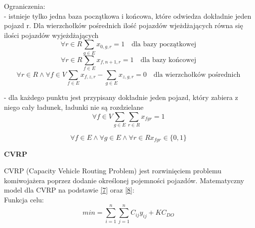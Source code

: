 \documentclass[a4paper, twoside, 12pt, justified]{article}
\begin{document}
	\hspace{-6mm}Ograniczenia:\\
	- istnieje tylko jedna baza początkowa i końcowa, które odwiedza dokładnie jeden pojazd r. Dla wierzchołków pośrednich ilość pojazdów wjeżdżających równa się ilości pojazdów wyjeżdżających\\
	
	\begin{equation}
	{\forall r \in R\sum\limits_{g \in E}}x_{0,g,r}=1 \quad \text{dla bazy początkowej}
	\end{equation}
	\begin{equation}
	{\forall r \in R\sum\limits_{f \in E}}x_{f,n+1,r}=1 \quad \text{dla bazy końcowej}
	\end{equation}
	\begin{equation}
	{\forall r \in R \wedge \forall f \in V\sum\limits_{f \in E}x_{f,z,r} -  \sum\limits_{g \in E}}x_{z,g,r} = 0\quad \text{dla wierzchołków pośrednich}
	\end{equation}
	
	\hspace{-6mm}- dla każdego punktu jest przypisany dokładnie jeden pojazd, który zabiera z niego cały ładunek, ładunki nie są rozdzielane\\
	
	\begin{equation}
	{\forall f \in V \sum\limits_{g \in E} \sum\limits_{r \in R}}x_{fgr} = 1 
	\end{equation}
	
	\begin{equation}
	{\forall f \in E \wedge \forall g \in E \wedge \forall r \in R}x_{fgr} \in \{0,1\} 
	\end{equation}

	\begin{large}
		\begin{center}
			\textbf{CVRP}
		\end{center}
	\end{large} 
	
	CVRP (Capacity Vehicle Routing Problem) jest rozwinięciem problemu komiwojażera poprzez dodanie określonej pojemności pojazdów. Matematyczny model dla CVRP na podstawie \hyperlink{cvrp}{[7]} oraz \hyperlink{cvrp2}{[8]}:\\
	
	Funkcja celu:\\
	\begin{equation}
	{min=\sum\limits_{i = 1}^{n}\sum\limits_{j = 1}^{n}}C_{ij}y_{ij} + KC_{DO}
	\end{equation}
	
\end{document}

